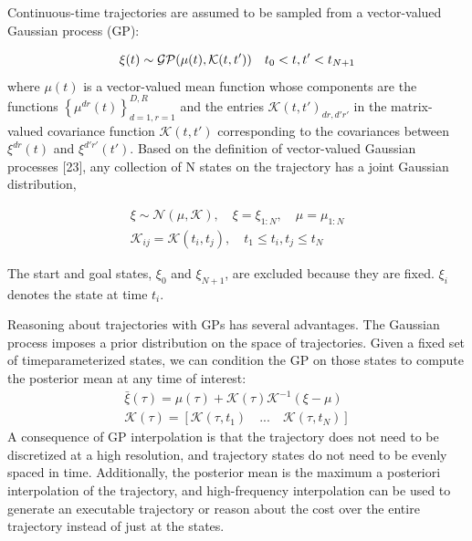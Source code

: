 \documentclass{IEEEtran}
\begin{document}
Continuous-time trajectories are assumed to be sampled
from a vector-valued Gaussian process (GP):

\begin{equation}
\xi(t)\sim{\emph{$\mathcal{GP}$}}(\mu(t),{\mathcal{K}}(t,t')) \quad 
t_0<t,t'<t_{N+1}
\end{equation}
where $\mu(t)$ is a vector-valued mean function whose components are the functions $\left\{\mu^{dr}{(t)}\right\}^{D,R}_{d=1,r=1}$ and the entries ${\mathcal{K}}(t,t')_{{dr},{d'r'}}$ in the matrix-valued covariance function  ${\mathcal{K}}(t,t')$ corresponding to the covariances between $\xi^{dr}(t)$ and $\xi^{d'r'}(t')$. Based on the definition of vector-valued Gaussian
processes [23], any collection of N states on the trajectory
has a joint Gaussian distribution,

\begin{equation}
\begin{split}
\xi\sim{\mathcal{N}(\mu,\mathcal{K})},\quad \xi=\xi_{1:N}, \quad \mu=\mu_{1:N} \\
\mathcal{K}_{ij}=\mathcal{K}(t_i,t_j),\quad 
t_1\leq{t_i},t_j\leq{t_N}
\end{split}
\end{equation}

The start and goal states, $\xi_0$ and $\xi_{N+1}$, are excluded because
they are fixed. $\xi_i$ denotes the state at time $t_i$.

Reasoning about trajectories with GPs has several advantages. The Gaussian process imposes a prior distribution
on the space of trajectories. Given a fixed set of timeparameterized states, we can condition the GP on those states
to compute the posterior mean at any time of interest:
\begin{gather}
\bar{\xi}(\tau)=\mu(\tau)+\mathcal{K}(\tau)\mathcal{K}^{-1}(\xi-\mu)\\
\mathcal{K}(\tau)=[\mathcal{K}(\tau,t_1) \quad... \quad \mathcal{K}(\tau,t_N)]
\end{gather}
A consequence of GP interpolation is that the trajectory does
not need to be discretized at a high resolution, and trajectory
states do not need to be evenly spaced in time. Additionally,
the posterior mean is the maximum a posteriori interpolation
of the trajectory, and high-frequency interpolation can be
used to generate an executable trajectory or reason about the
cost over the entire trajectory instead of just at the states.
\end{document}
